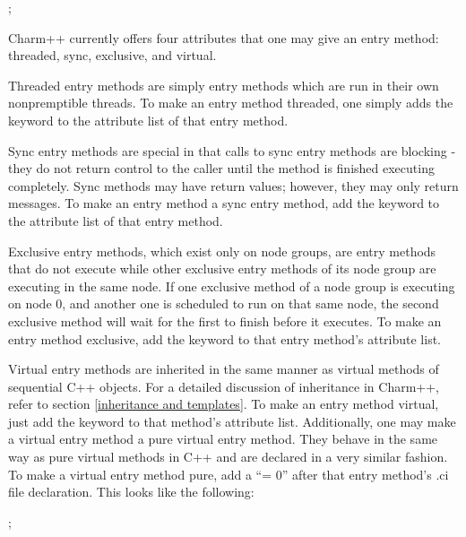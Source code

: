\small
{} ;
\normalsize

Charm++ currently offers four attributes that one may give an entry method:
threaded, sync, exclusive, and virtual.

Threaded entry methods are simply entry
methods which are run in their own nonpremptible threads.  To make an
entry method threaded, one simply adds the keyword
 to the attribute list of that entry method.

Sync entry methods are special in that calls to
sync entry methods are blocking - they do not return control to the caller
until the method is finished executing completely.  Sync methods may have
return values; however, they may only return messages.  To make an entry method a sync entry method, add the keyword  to the
attribute list of that entry method.

Exclusive entry methods, which exist only on node groups, are
entry methods that do not execute while other exclusive
entry methods of its node group are executing in the same
node.  If one exclusive method of a node group is executing on node 0, and
another one is scheduled to run on that same node, the second exclusive method
will wait for the first to finish before it executes.  To make an entry method exclusive, add the keyword  to that
entry method's attribute list.

Virtual entry methods are inherited in the
same manner as virtual methods of sequential C++ objects.  For a detailed
discussion of inheritance in Charm++, refer to section \ref{inheritance and
templates}.  To make an entry method virtual, just add the keyword
 to that method's attribute list.  Additionally, one may make
a virtual entry method a pure virtual entry method.  They
behave in the same way as pure virtual methods in C++ and are declared in a
very similar fashion.  To make a virtual entry method pure, add a ``= 0'' after
that entry method's .ci file declaration.  This looks like the following:

\small
{} ;
\normalsize



